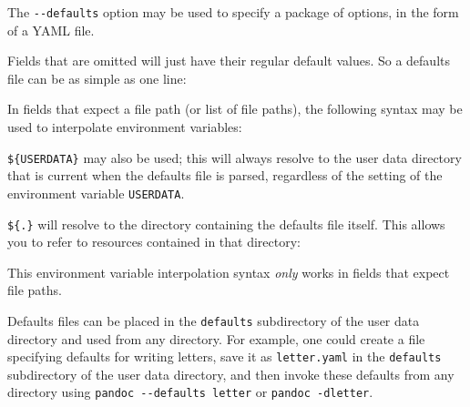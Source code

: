 The \texttt{-\/-defaults} option may be used to specify a package of
options, in the form of a YAML file.

Fields that are omitted will just have their regular default values. So
a defaults file can be as simple as one line:

\begin{Shaded}
\begin{Highlighting}[]
\KeywordTok{:}
\end{Highlighting}
\end{Shaded}

In fields that expect a file path (or list of file paths), the following
syntax may be used to interpolate environment variables:

\begin{Shaded}
\begin{Highlighting}[]
\KeywordTok{:}
\end{Highlighting}
\end{Shaded}

\texttt{\$\{USERDATA\}} may also be used; this will always resolve to
the user data directory that is current when the defaults file is
parsed, regardless of the setting of the environment variable
\texttt{USERDATA}.

\texttt{\$\{.\}} will resolve to the directory containing the defaults
file itself. This allows you to refer to resources contained in that
directory:

\begin{Shaded}
\begin{Highlighting}[]
\KeywordTok{:}
\KeywordTok{:}
\KeywordTok{:}
\KeywordTok{{-}}
\KeywordTok{{-}}
\end{Highlighting}
\end{Shaded}

This environment variable interpolation syntax \emph{only} works in
fields that expect file paths.

Defaults files can be placed in the \texttt{defaults} subdirectory of
the user data directory and used from any directory. For example, one
could create a file specifying defaults for writing letters, save it as
\texttt{letter.yaml} in the \texttt{defaults} subdirectory of the user
data directory, and then invoke these defaults from any directory using
\texttt{pandoc\ -\/-defaults\ letter} or \texttt{pandoc\ -dletter}.

